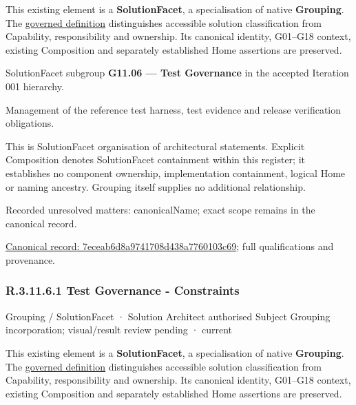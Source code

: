 This existing element is a \textbf{SolutionFacet}, a specialisation of native
\textbf{Grouping}. The \href{\detokenize{../../../../../../../governance/continuum-representation.md#solutionfacet-classification--1119-candidate}}{governed definition}
distinguishes accessible solution classification from Capability, responsibility
and ownership. Its canonical identity, G01–G18 context, existing Composition
and separately established Home assertions are preserved.



SolutionFacet subgroup \textbf{G11.06 — Test Governance} in the accepted Iteration 001 hierarchy.



Management of the reference test harness, test evidence and release verification obligations.



This is SolutionFacet organisation of architectural statements. Explicit Composition denotes SolutionFacet containment within this register; it establishes no component ownership, implementation containment, logical Home or naming ancestry. Grouping itself supplies no additional relationship.


{\small Recorded unresolved matters: canonicalName; exact scope remains in the canonical record.}\par
{\footnotesize \href{../../../../../../../continuum/grouping/7eceab6d8a9741708d438a7760103c69.md}{Canonical record: 7eceab6d8a9741708d438a7760103c69}; full qualifications and provenance.}\par
\subsubsection*{R.3.11.6.1 Test Governance - Constraints}
\label{navigation:R.3.11.6.1}

\label{element:c5f38ca4adc24f03a2b885938186e509}
{\small Grouping / SolutionFacet · Solution Architect authorised Subject Grouping incorporation; visual/result review pending · current}\par

This existing element is a \textbf{SolutionFacet}, a specialisation of native
\textbf{Grouping}. The \href{\detokenize{../../../../../../../governance/continuum-representation.md#solutionfacet-classification--1119-candidate}}{governed definition}
distinguishes accessible solution classification from Capability, responsibility
and ownership. Its canonical identity, G01–G18 context, existing Composition
and separately established Home assertions are preserved.



